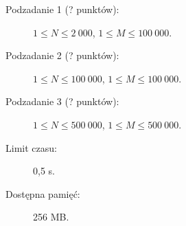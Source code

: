 \documentclass{boi2014-pl}
\begin{document}
    \Scoring

    \begin{description}
        \item[Podzadanie 1 (? punktów):] $1 \le N \le 2\ 000$, $1 \le M \le 100\ 000$.
        \item[Podzadanie 2 (? punktów):] $1 \le N \le 100\ 000$, $1 \le M \le 100\ 000$.
        \item[Podzadanie 3 (? punktów):] $1 \le N \le 500\ 000$, $1 \le M \le 500\ 000$.
    \end{description}

    \Constraints

    \begin{description}
        \item[Limit czasu:] 0,5 s.
        \item[Dostępna pamięć:] 256 MB.
    \end{description}
\end{document}
